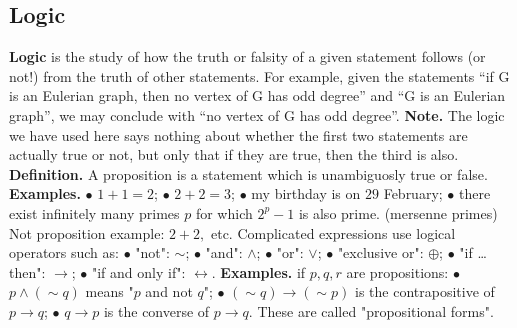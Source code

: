 \documentclass{article}
\begin{document}
\subsection{Logic}
\textbf{Logic } is the study of how the truth or falsity of a given statement follows (or not!) from the truth of other statements. For example, given the statements
\newline
\newline
“if G is an Eulerian graph, then no vertex of G has odd degree” and “G is an Eulerian graph”,
\newline
\newline
we may conclude with “no vertex of G has odd degree”.
\newline
\newline
\textbf{Note. } The logic we have used here says nothing about whether the first two statements are actually true or not, but only that if they are true, then the third is also.
\newline
\newline
\textbf{Definition. } A proposition is a statement which is unambiguosly true or false.
\newline
\newline
\textbf{Examples. }
\newline
\newline
$\bullet $ $1 + 1 = 2$;
\newline
$\bullet $ $2 + 2 = 3$;
\newline
$\bullet $ my birthday is on $29$ February;
\newline
$\bullet $ there exist infinitely many primes $p$ for which $2^p - 1$ is also prime. (mersenne primes)
\newline
\newline
Not proposition example: $2 + 2, $ etc.
\newline
\newline
Complicated expressions use logical operators such as:
\newline
$\bullet $ "not": $\sim$;
\newline
$\bullet $ "and": $\land$;
\newline
$\bullet $ "or": $\vee$;
\newline
$\bullet $ "exclusive or": $\oplus$;
\newline
$\bullet $ "if \dots then": $\rightarrow$;
\newline
$\bullet $ "if and only if": $\leftrightarrow$.
\newline
\newline
\textbf{Examples. } if $p, q, r$ are propositions:
\newline
\newline
$\bullet $ $p \land (\sim q)$ means "$p$ and not $q$";
\newline
$\bullet $ $(\sim q) \rightarrow (\sim p)$ is the contrapositive of $p \rightarrow q$;
\newline
$\bullet $ $q \rightarrow p$ is the converse of $p \rightarrow q.$
\newline
These are called "propositional forms".
\newline
{}
\newpage
\end{document}
